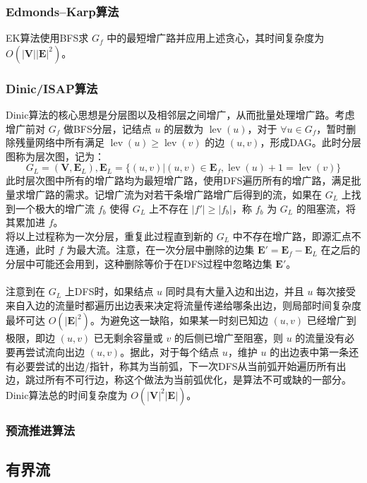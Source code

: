 \documentclass[12pt,a4paper]{article}
\begin{document}
\subsubsection{Edmonds–Karp算法}
EK算法使用BFS求 $G_f$ 中的最短增广路并应用上述贪心，其时间复杂度为 $O(|\mathbf{V}||\mathbf{E}|^2)$。\\
\subsubsection{Dinic/ISAP算法}
Dinic算法的核心思想是分层图以及相邻层之间增广，从而批量处理增广路。考虑增广前对 $G_f$ 做BFS分层，记结点 $u$ 的层数为 $\operatorname{lev}(u)$，对于 $\forall u\in G_f$，暂时删除残量网络中所有满足 $\operatorname{lev}(u)\ge\operatorname{lev}(v)$ 的边 $(u,v)$，形成DAG。此时分层图称为层次图，记为：
\begin{equation*}
	G_L=(\mathbf{V},\mathbf{E}_L),\mathbf{E}_L=\{(u,v)|(u,v)\in\mathbf{E}_f,\operatorname{lev}(u)+1=\operatorname{lev}(v)\}
\end{equation*}
此时层次图中所有的增广路均为最短增广路，使用DFS遍历所有的增广路，满足批量求增广路的需求。记增广流为对若干条增广路增广后得到的流，如果在 $G_L$ 上找到一个极大的增广流 $f_b$ 使得 $G_L$ 上不存在 $|f'|\ge|f_b|$，称 $f_b$ 为 $G_L$ 的阻塞流，将其累加进 $f$。\\
将以上过程称为一次分层，重复此过程直到新的 $G_L$ 中不存在增广路，即源汇点不连通，此时 $f$ 为最大流。注意，在一次分层中删除的边集 $\mathbf{E}'=\mathbf{E}_f-\mathbf{E}_L$ 在之后的分层中可能还会用到，这种删除等价于在DFS过程中忽略边集 $\mathbf{E}'$。\\
\\
注意到在 $G_L$ 上DFS时，如果结点 $u$ 同时具有大量入边和出边，并且 $u$ 每次接受来自入边的流量时都遍历出边表来决定将流量传递给哪条出边，则局部时间复杂度最坏可达 $O(|\mathbf{E}|^2)$。为避免这一缺陷，如果某一时刻已知边 $(u, v)$ 已经增广到极限，即边 $(u, v)$ 已无剩余容量或 $v$ 的后侧已增广至阻塞，则 $u$ 的流量没有必要再尝试流向出边 $(u, v)$。据此，对于每个结点 $u$，维护 $u$ 的出边表中第一条还有必要尝试的出边/指针，称其为当前弧，下一次DFS从当前弧开始遍历所有出边，跳过所有不可行边，称这个做法为当前弧优化，是算法不可或缺的一部分。Dinic算法总的时间复杂度为 $O(|\mathbf{V}|^2|\mathbf{E}|)$。

\subsubsection{预流推进算法}
\subsection{有界流} %
\end{document}
